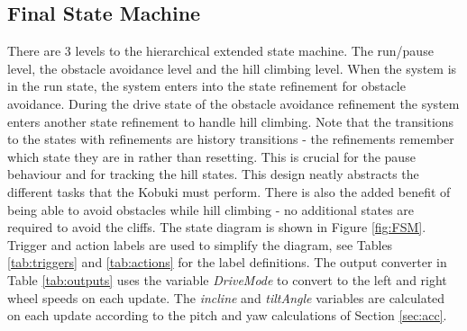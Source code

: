 \documentclass[11pt]{article}
\begin{document}
\subsection{Final State Machine}
There are 3 levels to the hierarchical extended state machine. The run/pause level, the obstacle avoidance level and the hill climbing level. When the system is in the run state, the system enters into the state refinement for obstacle avoidance. During the drive state of the obstacle avoidance refinement the system enters another state refinement to handle hill climbing. Note that the transitions to the states with refinements are history transitions - the refinements remember which state they are in rather than resetting. This is crucial for the pause behaviour and for tracking the hill states. This design neatly abstracts the different tasks that the Kobuki must perform. There is also the added benefit of being able to avoid obstacles while hill climbing - no additional states are required to avoid the cliffs. The state diagram is shown in Figure \ref{fig:FSM}. Trigger and action labels are used to simplify the diagram, see Tables \ref{tab:triggers} and \ref{tab:actions} for the label definitions. The output converter in Table \ref{tab:outputs} uses the variable \textit{DriveMode} to convert to the left and right wheel speeds on each update. The \textit{incline} and \textit{tiltAngle} variables are calculated on each update according to the pitch and yaw calculations of Section \ref{sec:acc}.\\ %
\end{document}
